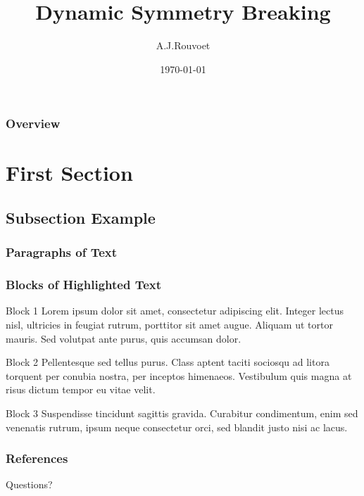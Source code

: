 \documentclass{beamer}
\title[Short title]{Dynamic Symmetry Breaking}
\author{A.J.Rouvoet}
\institute[TU Delft]
{
	Delft, University of Technology \\
	\medskip
	\textit{a.j.rouvoet@student.tudelft.nl}
}
\date{\today}
\begin{document}
\begin{frame}
	\titlepage %
\end{frame}

\begin{frame}
	\frametitle{Overview}
	\tableofcontents
\end{frame}


\section{First Section}

\subsection{Subsection Example}

\begin{frame}
	\frametitle{Paragraphs of Text}
\end{frame}

\begin{frame}
	\frametitle{Blocks of Highlighted Text}
	\begin{block}{Block 1}
		Lorem ipsum dolor sit amet, consectetur adipiscing elit. Integer lectus nisl, ultricies in
		feugiat rutrum, porttitor sit amet augue. Aliquam ut tortor mauris. Sed volutpat ante purus,
		quis accumsan dolor.
	\end{block}

	\begin{block}{Block 2}
  		Pellentesque sed tellus purus. Class aptent taciti sociosqu ad litora torquent per conubia
		nostra, per inceptos himenaeos. Vestibulum quis magna at risus dictum tempor eu vitae velit.
	\end{block}

	\begin{block}{Block 3}
		Suspendisse tincidunt sagittis gravida. Curabitur condimentum, enim sed venenatis rutrum,
		ipsum neque consectetur orci, sed blandit justo nisi ac lacus.\cite{audemard2007symmetry}
	\end{block}
\end{frame}

\begin{frame}[allowframebreaks]
	\frametitle{References}
	
	
\end{frame}

\begin{frame}
\Huge{\centerline{Questions?}}
\end{frame}
\end{document}
